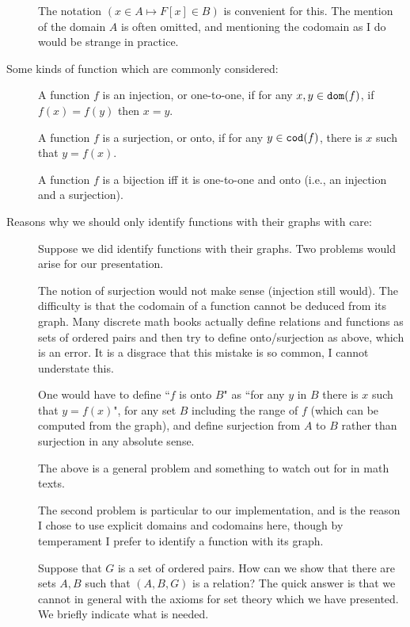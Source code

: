 \documentclass[12pt]{article}
\begin{document}
\begin{description}
The notation $(x \in A \mapsto F[x] \in B)$ is convenient for this.  The mention of the domain $A$ is often omitted, and mentioning the codomain as I do would be strange in practice.



\item[Some kinds of function which are commonly considered:]

A function $f$ is an injection, or one-to-one, if for any $x,y \in {\tt dom}(f)$, if $f(x)=f(y)$ then $x=y$.

A function $f$ is a surjection, or onto, if for any $y \in {\tt cod}(f)$, there is $x$ such that $y = f(x)$.

A function $f$ is a bijection iff it is one-to-one and onto (i.e., an injection and a surjection).



\item[Reasons why we should only identify functions with their graphs with care:]

Suppose we did identify functions with their graphs.  Two problems would arise for our presentation.

The notion of surjection would not make sense (injection still would).  The difficulty is that
the codomain of a function cannot be deduced from its graph.  Many discrete math books actually
define relations and functions as sets of ordered pairs and then try to define onto/surjection as above, which is an error.  It is a disgrace that this mistake is so common, I cannot understate this.

One would have to define ``$f$ is onto $B$" as ``for any $y$ in $B$ there is $x$ such that $y=f(x)$", for any set
$B$ including the range of $f$ (which can be computed from the graph), and define surjection from $A$ to $B$ rather than surjection in any absolute sense.

The above is a general problem and something to watch out for in math texts.

The second problem is particular to our implementation, and is the reason I chose to use explicit domains and codomains here, though by temperament I prefer to identify a function with its graph.

Suppose that $G$ is a set of ordered pairs.  How can we show that there are sets $A,B$ such that $(A,B,G)$ is a relation?
The quick answer is that we cannot in general with the axioms for set theory which we have presented.  We briefly indicate what is needed.


\end{description}
\end{document}
